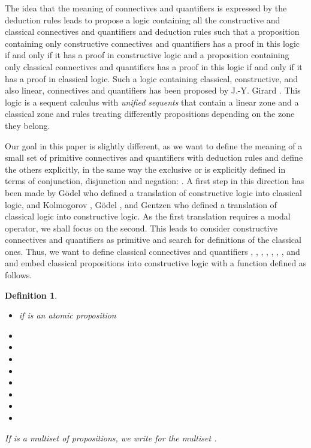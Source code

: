 \documentclass{article}
\newtheorem{definition}{Definition}
\begin{document}
The idea that the meaning of connectives and quantifiers is expressed
by the deduction rules leads to propose a logic containing all the
constructive and classical connectives and quantifiers and deduction
rules such that a proposition containing only constructive connectives
and quantifiers
has a proof in this logic if and only if it has a proof in
constructive logic and a proposition containing only classical
connectives and quantifiers
has a proof in this logic if and only if it has a proof in
classical logic.  Such a logic containing classical, constructive, and
also linear, connectives and quantifiers has been proposed by J.-Y. Girard
\cite{Girard}. This logic is a sequent calculus with {\em unified
  sequents} that contain a linear zone and a classical zone and rules
treating differently propositions depending on the zone they belong.

Our goal in this paper is slightly different, as we want to define the
meaning of a small set of primitive connectives and quantifiers with
deduction rules and define the others explicitly, in the same way the
exclusive or is explicitly defined in terms of conjunction,
disjunction and negation: .  A first step in this direction has been made by G\"odel
\cite{GodelS4} who defined a translation of constructive logic into
classical logic, and Kolmogorov \cite{Kolmogorov}, G\"odel
\cite{Godel}, and Gentzen \cite{Gentzen} who defined a
translation of classical logic into constructive logic.
As the first translation requires a modal
operator, we shall focus on the second. This leads to consider
constructive connectives and quantifiers as primitive and search for
definitions of the classical ones.  Thus, we want to define classical
connectives and quantifiers , , , ,
, , , and  and embed classical
propositions into constructive logic with a function  defined
as follows.
\begin{definition}~
\begin{itemize}
\item  if  is an atomic proposition
\item 
\item 
\item 
\item 
\item 
\item 
\item 
\item 
\end{itemize}
If  is a multiset of propositions, we write 
 for the multiset .
\end{definition}
\end{document}
